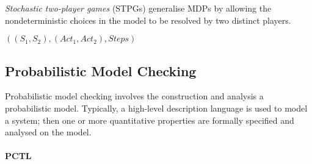 \documentclass{llncs}
\newcommand{\comment}[1]{{\color{red}{[\sf #1]}}}
\begin{document}


\vskip5pt
\emph{Stochastic two-player games} (STPGs) generalise MDPs by allowing the nondeterministic choices
in the model to be resolved by two distinct players.

$((S_1,S_2),(Act_1,Act_2),Steps)$
\comment{do we partition states or actions?}

\subsection{Probabilistic Model Checking}

\comment{hi-level descr. already (now) in intro; focus on property spec and point to model checking algorithms here...}

Probabilistic model checking involves the construction and analysis a probabilistic model.
Typically, a high-level description language is used to model a system;
then one or more quantitative properties are formally specified and analysed on the model.

\paragraph{PCTL}


\end{document}
